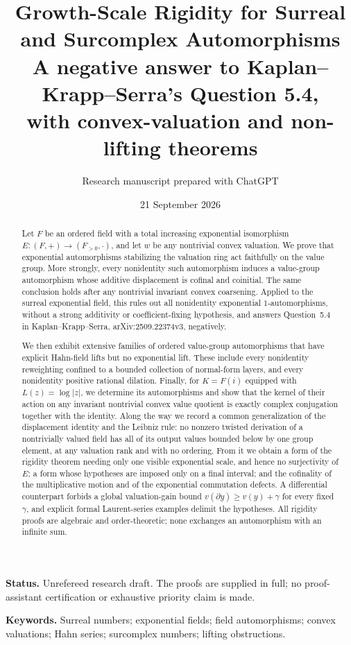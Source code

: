 \documentclass[11pt]{article}
\title{\color{inkblue}\bfseries Growth-Scale Rigidity for Surreal\texorpdfstring{\\}{ }and Surcomplex Automorphisms\\[0.5em]
\large A negative answer to Kaplan--Krapp--Serra's Question 5.4,\\
with convex-valuation and non-lifting theorems}
\author{Research manuscript prepared with ChatGPT}
\date{21 September 2026}
\theoremstyle{definition}
\theoremstyle{remark}
\newcommand{\abs}[1]{\lvert #1\rvert}
\numberwithin{equation}{section}
\begin{document}
\maketitle
\thispagestyle{empty}
\begin{abstract}
Let $F$ be an ordered field with a total increasing exponential isomorphism
$E:(F,+)\to(F_{>0},\cdot)$, and let $w$ be any nontrivial convex valuation.
We prove that exponential automorphisms stabilizing the valuation ring act
faithfully on the value group. More strongly, every nonidentity such
automorphism induces a value-group automorphism whose additive displacement
is cofinal and coinitial. The same conclusion holds after any nontrivial
invariant convex coarsening. Applied to the surreal exponential field, this
rules out all nonidentity exponential $1$-automorphisms, without a strong
additivity or coefficient-fixing hypothesis, and answers Question~5.4 in
Kaplan--Krapp--Serra, arXiv:2509.22374v3, negatively.

We then exhibit extensive families of ordered value-group automorphisms that
have explicit Hahn-field lifts but no exponential lift. These include every
nonidentity reweighting confined to a bounded collection of normal-form layers,
and every nonidentity positive rational dilation. Finally, for
$K=F(i)$ equipped with $L(z)=\log\abs z$, we determine its automorphisms and show
that the kernel of their action on any invariant nontrivial convex value
quotient is exactly complex conjugation together with the identity.
Along the way we record a common generalization of the displacement identity
and the Leibniz rule: no nonzero twisted derivation of a nontrivially valued
field has all of its output values bounded below by one group element, at any
valuation rank and with no ordering. From it we obtain a form of the rigidity
theorem needing only one visible exponential scale, and hence no surjectivity
of $E$; a form whose hypotheses are imposed only on a final interval; and the
cofinality of the multiplicative motion and of the exponential commutation
defects. A differential counterpart forbids a global valuation-gain bound
$v(\partial y)\ge v(y)+\gamma$ for every fixed $\gamma$, and explicit formal
Laurent-series examples delimit the hypotheses.
All rigidity proofs are algebraic and order-theoretic; none exchanges an
automorphism with an infinite sum.
\end{abstract}
\begin{center}
\small\textbf{Status.} Unrefereed research draft. The proofs are supplied in full;
no proof-assistant certification or exhaustive priority claim is made.
\end{center}
\vspace{0.3em}
\noindent\textbf{Keywords.} Surreal numbers; exponential fields; field automorphisms;
convex valuations; Hahn series; surcomplex numbers; lifting obstructions.
\clearpage
\begingroup
\small
\setlength{\parskip}{0pt}
\tableofcontents
\endgroup
\clearpage
\end{document}

